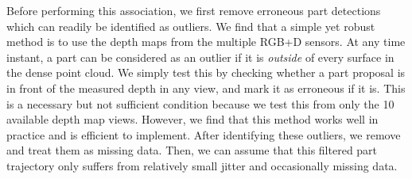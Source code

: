 Before performing this association, we first remove erroneous part detections which can readily be identified as outliers. 
We find that a simple yet robust method is to use the depth maps from the multiple RGB+D sensors. At any time instant, a part can be considered as an outlier if it is {\em outside} of every surface in the dense point cloud. We simply test this by checking whether a part proposal is in front of the measured depth in any view, and mark it as erroneous if it is. 
This is a necessary but not sufficient condition because we test this from only the 10 available depth map views.
However, we find that this method works well in practice and is efficient to implement. After identifying these outliers, we remove and treat them as missing data. Then, we can assume that this filtered part trajectory only suffers from relatively small jitter and occasionally missing data. 

